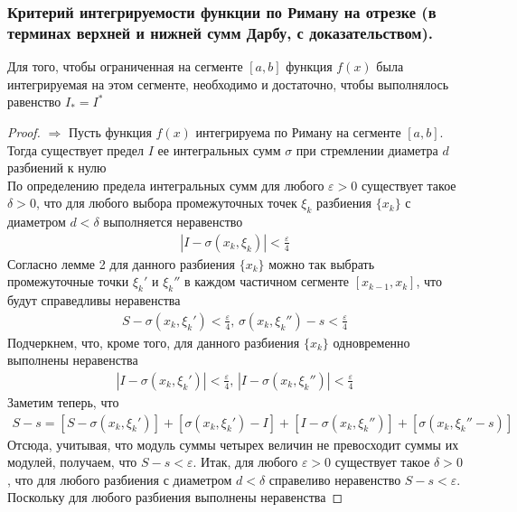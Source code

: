 \documentclass[10pt]{article}
\begin{document}
    \subsubsection{Критерий интегрируемости функции по Риману на отрезке (в терминах верхней и нижней сумм Дарбу, с доказательством).}
    \begin{theorem}
        Для того, чтобы ограниченная на сегменте $[a, b]$ функция $f(x)$ была интегрируемая на этом сегменте, необходимо и достаточно, чтобы выполнялось равенство $I_* = I^*$
    \end{theorem}
    \begin{proof}
        $\Rightarrow$
        Пусть функция $f(x)$ интегрируема по Риману на сегменте $[a, b]$. Тогда существует предел $I$ ее интегральных сумм $\sigma$ при стремлении диаметра $d$ разбиений к нулю \\
        По определению предела интегральных сумм для любого $\varepsilon > 0$ существует такое $\delta > 0$, что для любого выбора промежуточных точек $\xi_k$ разбиения $\{x_k\}$ с диаметром $d < \delta$ выполняется неравенство
        \begin{gather*}
            |I - \sigma(x_k, \xi_k)| < \frac{\varepsilon}{4}
        \end{gather*}
        Согласно лемме 2 для данного разбиения $\{x_k\}$ можно так выбрать промежуточные точки $\xi_k'$ и $\xi_k''$ в каждом частичном сегменте $[x_{k-1}, x_k]$, что будут справедливы неравенства
        \begin{gather*}
            S - \sigma(x_k, \xi_k') < \frac{\varepsilon}{4},\, \sigma(x_k, \xi_k'') - s < \frac{\varepsilon}{4}
        \end{gather*}
        Подчеркнем, что, кроме того, для данного разбиения $\{x_k\}$ одновременно выполнены неравенства
        \begin{gather*}
            |I - \sigma(x_k, \xi_k')| < \frac{\varepsilon}{4},\,|I - \sigma(x_k, \xi_k'')| < \frac{\varepsilon}{4}
        \end{gather*}
        Заметим теперь, что
        \begin{gather*}
            S-s=[S-\sigma(x_k, \xi_k')] + [\sigma(x_k, \xi_k') - I] + [I-\sigma(x_k, \xi_k'')] + [\sigma(x_k, \xi_k'' - s)]
        \end{gather*}
        Отсюда, учитывая, что модуль суммы четырех величин не превосходит суммы их модулей, получаем, что $S-s<\varepsilon$. Итак, для любого $\varepsilon > 0$ существует такое $\delta > 0$, что для любого разбиения с диаметром $d < \delta$ справеливо неравенство $S-s<\varepsilon$. Поскольку для любого разбиения выполнены неравенства

\end{proof}
\end{document}

